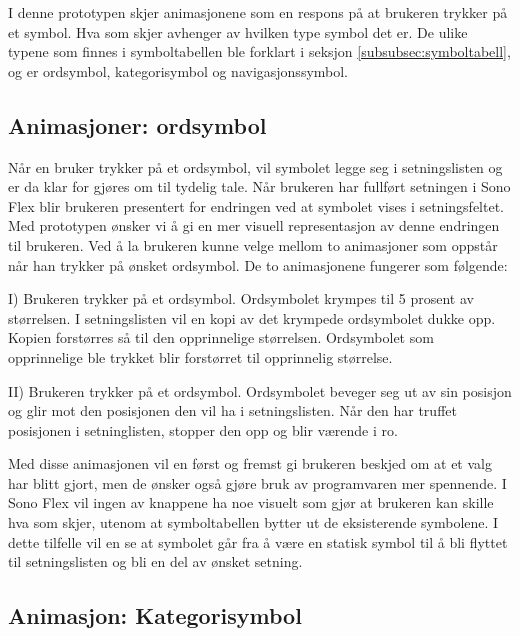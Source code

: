{ 
I denne prototypen skjer animasjonene som en respons på at brukeren trykker på et symbol. Hva som skjer avhenger av hvilken type symbol det er. De ulike typene som finnes i symboltabellen ble forklart i seksjon \ref{subsubsec:symboltabell}, og er ordsymbol, kategorisymbol og navigasjonssymbol. 
 
 
 
 
\subsection{Animasjoner: ordsymbol} 
 
 
Når en bruker trykker på et ordsymbol, vil symbolet legge seg i setningslisten og er da klar for gjøres om til tydelig tale. Når brukeren har fullført setningen i Sono Flex blir brukeren presentert for endringen ved at symbolet vises i setningsfeltet. Med prototypen ønsker vi  å gi en mer visuell representasjon av denne endringen til brukeren. Ved å la brukeren kunne velge mellom to animasjoner som oppstår når han trykker på ønsket ordsymbol. De to animasjonene fungerer som følgende: 
 
 
 
 
I) Brukeren trykker på et ordsymbol. 
   Ordsymbolet krympes til 5 prosent av størrelsen. 
   I setningslisten vil en kopi av det krympede ordsymbolet dukke opp. 
   Kopien forstørres så til den opprinnelige størrelsen. 
   Ordsymbolet som opprinnelige ble trykket blir forstørret til opprinnelig størrelse. 
 
 
    
II) Brukeren trykker på et ordsymbol. 
    Ordsymbolet beveger seg ut av sin posisjon og glir mot den posisjonen den vil ha i setningslisten. 
    Når den har truffet posisjonen i setninglisten, stopper den opp og blir værende i ro. 
 
 
    Med disse animasjonen vil en først og fremst gi brukeren beskjed om at et valg har blitt gjort, men de ønsker også gjøre bruk av programvaren mer spennende.  I Sono Flex  vil ingen av knappene ha noe visuelt som gjør at brukeren kan skille hva som skjer, utenom at symboltabellen bytter ut de eksisterende symbolene. I dette tilfelle vil en se at symbolet går fra å være en statisk symbol til å bli flyttet til setningslisten og bli en del av ønsket setning.  
 
 
 
 
 
 
\subsection{Animasjon: Kategorisymbol} 
 
}
